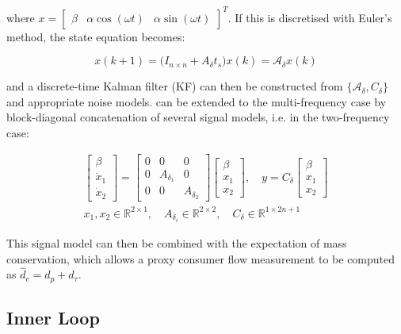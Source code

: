where $x = \begin{bmatrix}\beta & \alpha \cos(\omega t) & \alpha \sin(\omega t)\end{bmatrix}^T$. If this is discretised with Euler's method, the state equation becomes:

\begin{equation}\label{eq:TheisticDisturbanceEstimatorDiscrete}
	x(k+1) = \Big(I_{n\times n} + A_\delta t_s \Big) x(k) = \mathcal{A}_\delta x(k)
\end{equation}

and a discrete-time Kalman filter (KF) can then be constructed from $\{\mathcal{A}_\delta,C_\delta\}$ and appropriate noise models.  can be extended to the multi-frequency case by block-diagonal concatenation of several signal models, i.e. in the two-frequency case:

\begin{equation}\label{eq:DisturbanceVectorCase}
	\begin{gathered}
		\begin{bmatrix} \beta \\ \dot{x}_1 \\ \dot{x}_2 \end{bmatrix} = \begin{bmatrix} 0 & 0 & 0 \\ 0 & A_{\delta_1} & 0 \\ 0 & 0 & A_{\delta_2} \end{bmatrix} \begin{bmatrix}\beta \\ x_1 \\ x_2 \end{bmatrix},
		 \quad y = C_\delta \begin{bmatrix}\beta \\ x_1 \\ x_2 \end{bmatrix} \\
		 x_1, x_2 \in \mathbb{R}^{2\times1}, \quad {A}_{\delta_i} \in \mathbb{R}^{2\times2}, \quad
		 C_\delta \in \mathbb{R}^{1\times2n+1}
	\end{gathered}
\end{equation}

This signal model can then be combined with the expectation of mass conservation, which allows a proxy consumer flow measurement to be computed as $\hat{d}_c = d_p + d_\tau$.


\subsection{Inner Loop}\label{subsec:InnerLoop}

